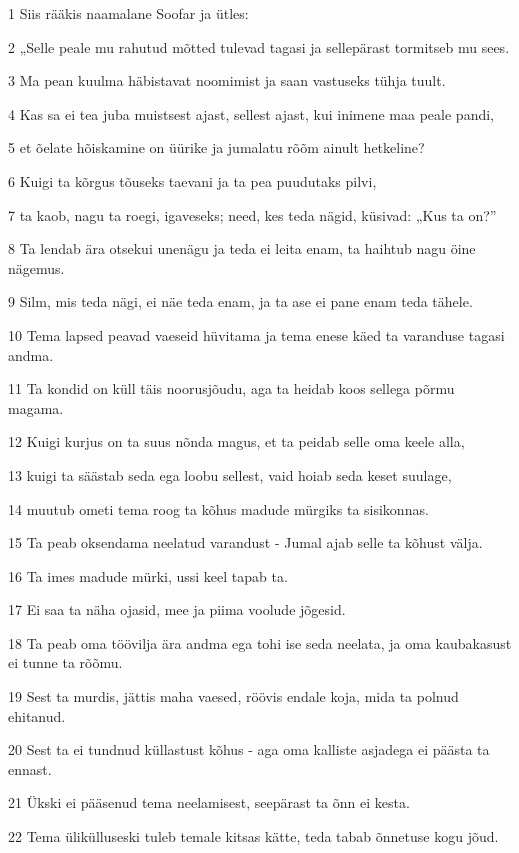 \par 1 Siis rääkis naamalane Soofar ja ütles:
\par 2 „Selle peale mu rahutud mõtted tulevad tagasi ja sellepärast tormitseb mu sees.
\par 3 Ma pean kuulma häbistavat noomimist ja saan vastuseks tühja tuult.
\par 4 Kas sa ei tea juba muistsest ajast, sellest ajast, kui inimene maa peale pandi,
\par 5 et õelate hõiskamine on üürike ja jumalatu rõõm ainult hetkeline?
\par 6 Kuigi ta kõrgus tõuseks taevani ja ta pea puudutaks pilvi,
\par 7 ta kaob, nagu ta roegi, igaveseks; need, kes teda nägid, küsivad: „Kus ta on?”
\par 8 Ta lendab ära otsekui unenägu ja teda ei leita enam, ta haihtub nagu öine nägemus.
\par 9 Silm, mis teda nägi, ei näe teda enam, ja ta ase ei pane enam teda tähele.
\par 10 Tema lapsed peavad vaeseid hüvitama ja tema enese käed ta varanduse tagasi andma.
\par 11 Ta kondid on küll täis noorusjõudu, aga ta heidab koos sellega põrmu magama.
\par 12 Kuigi kurjus on ta suus nõnda magus, et ta peidab selle oma keele alla,
\par 13 kuigi ta säästab seda ega loobu sellest, vaid hoiab seda keset suulage,
\par 14 muutub ometi tema roog ta kõhus madude mürgiks ta sisikonnas.
\par 15 Ta peab oksendama neelatud varandust - Jumal ajab selle ta kõhust välja.
\par 16 Ta imes madude mürki, ussi keel tapab ta.
\par 17 Ei saa ta näha ojasid, mee ja piima voolude jõgesid.
\par 18 Ta peab oma töövilja ära andma ega tohi ise seda neelata, ja oma kaubakasust ei tunne ta rõõmu.
\par 19 Sest ta murdis, jättis maha vaesed, röövis endale koja, mida ta polnud ehitanud.
\par 20 Sest ta ei tundnud küllastust kõhus - aga oma kalliste asjadega ei päästa ta ennast.
\par 21 Ükski ei pääsenud tema neelamisest, seepärast ta õnn ei kesta.
\par 22 Tema ülikülluseski tuleb temale kitsas kätte, teda tabab õnnetuse kogu jõud.
